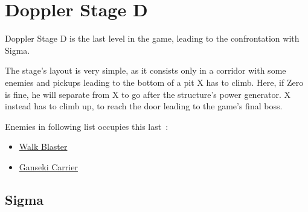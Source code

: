 \section{Doppler Stage D}
Doppler Stage D is the last level in the game, leading to the confrontation with Sigma. 

The stage's layout is very simple, as it consists only in a corridor with some enemies and pickups leading to the bottom of a pit X has to climb. Here, if Zero is fine, he will separate from X to go after the structure's power generator. X instead has to climb up, to reach the door leading to the game's final boss.

Enemies in following list occupies this last~\cite{wiki:Doppler_stage}:
\begin{itemize}
	\item \hyperlink{enem:Walk_Blaster}{Walk Blaster}
	\item \hyperlink{enem:Ganseki_Carrier}{Ganseki Carrier}
\end{itemize}

\subsection{Sigma}\label{boss:Sigma_x3}


